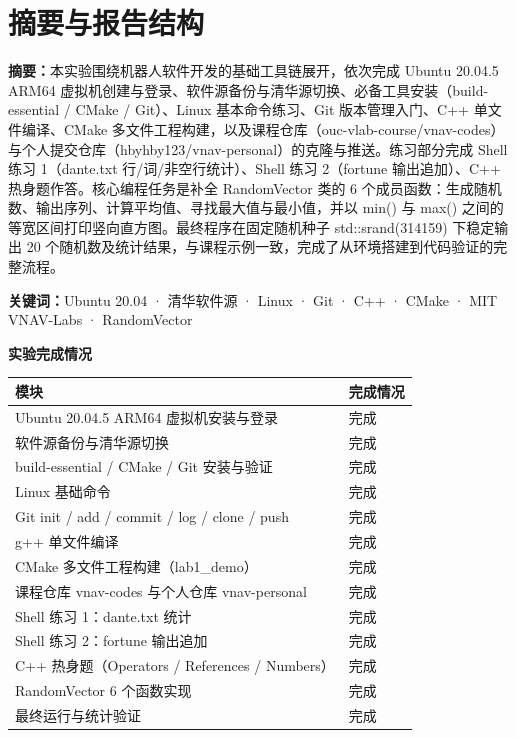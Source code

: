 \documentclass[12pt,a4paper]{ctexart}
\begin{document}
\section*{摘要与报告结构}

\noindent\textbf{摘要：}本实验围绕机器人软件开发的基础工具链展开，依次完成 Ubuntu 20.04.5 ARM64 虚拟机创建与登录、软件源备份与清华源切换、必备工具安装（build-essential / CMake / Git）、Linux 基本命令练习、Git 版本管理入门、C++ 单文件编译、CMake 多文件工程构建，以及课程仓库（ouc-vlab-course/vnav-codes）与个人提交仓库（hbyhby123/vnav-personal）的克隆与推送。练习部分完成 Shell 练习 1（dante.txt 行/词/非空行统计）、Shell 练习 2（fortune 输出追加）、C++ 热身题作答。核心编程任务是补全 RandomVector 类的 6 个成员函数：生成随机数、输出序列、计算平均值、寻找最大值与最小值，并以 min() 与 max() 之间的等宽区间打印竖向直方图。最终程序在固定随机种子 std::srand(314159) 下稳定输出 20 个随机数及统计结果，与课程示例一致，完成了从环境搭建到代码验证的完整流程。

\vspace{4pt}
\noindent\textbf{关键词：}Ubuntu 20.04 · 清华软件源 · Linux · Git · C++ · CMake · MIT VNAV-Labs · RandomVector

\vspace{6pt}
\tableofcontents

\vspace{8pt}
\noindent\textbf{实验完成情况}
\begin{center}
\begin{tabular}{ll}
\toprule
模块 & 完成情况 \\
\midrule
Ubuntu 20.04.5 ARM64 虚拟机安装与登录 & 完成 \\
软件源备份与清华源切换 & 完成 \\
build-essential / CMake / Git 安装与验证 & 完成 \\
Linux 基础命令 & 完成 \\
Git init / add / commit / log / clone / push & 完成 \\
g++ 单文件编译 & 完成 \\
CMake 多文件工程构建（lab1\_demo） & 完成 \\
课程仓库 vnav-codes 与个人仓库 vnav-personal & 完成 \\
Shell 练习 1：dante.txt 统计 & 完成 \\
Shell 练习 2：fortune 输出追加 & 完成 \\
C++ 热身题（Operators / References / Numbers） & 完成 \\
RandomVector 6 个函数实现 & 完成 \\
最终运行与统计验证 & 完成 \\
\bottomrule
\end{tabular}
\end{center}
\end{document}
